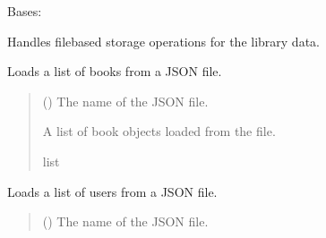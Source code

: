 \documentclass[letterpaper,10pt,english,openany,oneside]{sphinxmanual}
\begin{document}
\begin{fulllineitems}
\label{\detokenize{storage:storage.Storage}}
\pysigstartsignatures
{}
\pysigstopsignatures
\sphinxAtStartPar
Bases: 

\sphinxAtStartPar
Handles file\sphinxhyphen{}based storage operations for the library data.

\begin{fulllineitems}
\label{\detokenize{storage:storage.Storage.load_books}}
\pysigstartsignatures
{}
\pysigstopsignatures
\sphinxAtStartPar
Loads a list of books from a JSON file.
\begin{quote}\begin{description}
\sphinxAtStartPar
{} () \textendash{} The name of the JSON file.

\sphinxAtStartPar
A list of book objects loaded from the file.

\sphinxAtStartPar
list

\end{description}\end{quote}

\end{fulllineitems}


\begin{fulllineitems}
\label{\detokenize{storage:storage.Storage.load_users}}
\pysigstartsignatures
{}
\pysigstopsignatures
\sphinxAtStartPar
Loads a list of users from a JSON file.
\begin{quote}\begin{description}
\sphinxAtStartPar
{} () \textendash{} The name of the JSON file.


\end{description}
\end{quote}
\end{fulllineitems}
\end{fulllineitems}
\end{document}
